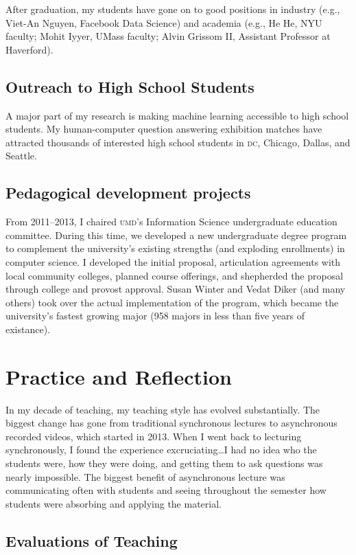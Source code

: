 \documentclass[11pt]{amsart}
\newcommand{\abr}[1]{\textsc{#1}}
\begin{document}
After graduation, my students have gone on to good positions in industry (e.g.,
Viet-An Nguyen, Facebook Data Science) and academia (e.g., He He, NYU faculty;
Mohit Iyyer, UMass faculty; Alvin Grissom II, Assistant Professor at
Haverford).

\subsection{Outreach to High School Students}

A major part of my research is making machine learning accessible to
high school students.  My human-computer question answering exhibition
matches have attracted thousands of interested high school students in
\abr{dc}, Chicago, Dallas, and Seattle.

\subsection{Pedagogical development projects}

From 2011--2013, I chaired \abr{umd}'s Information Science undergraduate
education committee. During this time, we developed a new undergraduate degree
program to complement the university's existing strengths (and exploding
enrollments) in computer science. I developed the initial proposal,
articulation agreements with local community colleges, planned course
offerings, and shepherded the proposal through college and provost approval.
Susan Winter and Vedat Diker (and many others) took over the actual
implementation of the program, which became the university's fastest growing
major (958 majors in less than five years of existance).

\section{Practice and Reflection}

In my decade of teaching, my teaching style has evolved substantially. The
biggest change has gone from traditional synchronous lectures to asynchronous
recorded videos, which started in 2013. When I went back to lecturing
synchronously, I found the experience excruciating\dots I had no idea who the
students were, how they were doing, and getting them to ask questions was
nearly impossible. The biggest benefit of asynchronous lecture was
communicating often with students and seeing throughout the semester how
students were absorbing and applying the material.

\subsection{Evaluations of Teaching}
\end{document}
